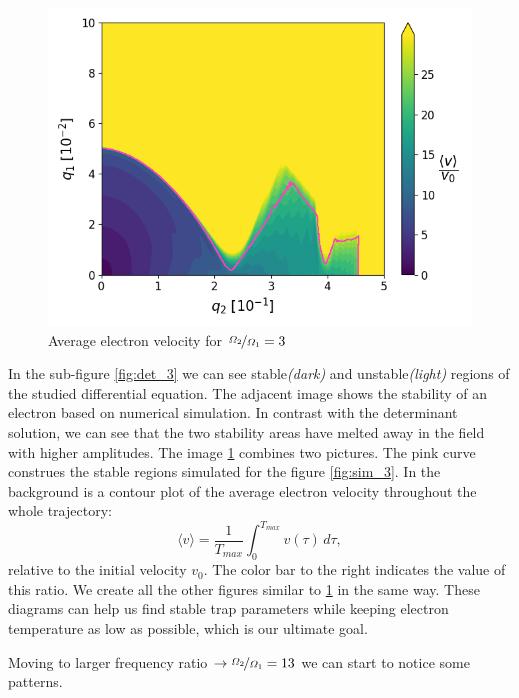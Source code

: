 \begin{figure}[H]
	\centering
	\includegraphics[width=\linewidth]{img/0_ions_1_electrons_q1_0.0-0.1_q2_0.0-0.5_960x960_3_1000.png}
	\caption{Average electron velocity for $\nicefrac{\Omega_2}{\Omega_1} = 3$}
	\label{fig:velocityedge-eta=3}
\end{figure}

In the sub-figure \ref{fig:det_3} we can see stable\textit{(dark)} and unstable\textit{(light)} regions of the studied differential equation. The adjacent image shows the stability of an electron based on numerical simulation. In contrast with the determinant solution, we can see that the two stability areas have melted away in the field with higher amplitudes. The image \ref{fig:velocityedge-eta=3} combines two pictures. The pink curve construes the stable regions simulated for the figure \ref{fig:sim_3}. In the background is a contour plot of the average electron velocity throughout the whole trajectory: $$\langle v \rangle = \dfrac{1}{T_{max}} \int_{0}^{T_{max}} v(\tau) \, d\tau,$$ relative to the initial velocity $v_0$. The color bar to the right indicates the value of this ratio. We create all the other figures similar to \ref{fig:velocityedge-eta=3} in the same way. These diagrams can help us find stable trap parameters while keeping electron temperature as low as possible, which is our ultimate goal.

Moving to larger frequency ratio $\rightarrow \nicefrac{\Omega_2}{\Omega_1} = 13$ we can start to notice some patterns.

